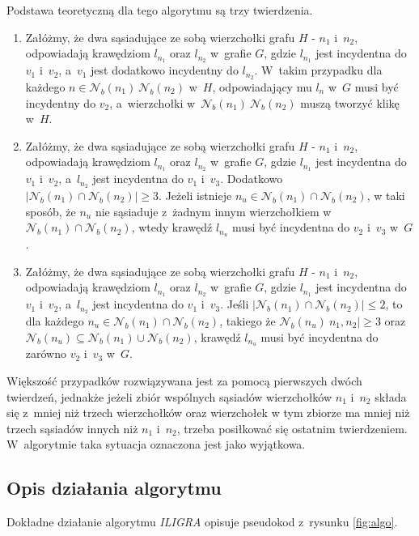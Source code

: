 \documentclass{article}
\begin{document}
Podstawa teoretyczną dla tego algorytmu są trzy twierdzenia. 
\begin{enumerate}
	\item Załóżmy, że dwa sąsiadujące ze sobą wierzchołki grafu $H$ - $n_1$ i~$n_2$, odpowiadają krawędziom $l_{n_1}$ oraz $l_{n_2}$ w~grafie $G$, gdzie $l_{n_1}$ jest incydentna do $v_1$ i~$v_2$, a~$v_1$ jest dodatkowo incydentny do $l_{n_2}$. W~takim przypadku dla każdego $n\in \mathcal{N}_b(n_1)\ \mathcal{N}_b(n_2)$ w~$H$, odpowiadający mu $l_n$ w~$G$ musi być incydentny do $v_2$, a~wierzchołki w~$\mathcal{N}_b(n_1)\ \mathcal{N}_b(n_2)$ muszą tworzyć klikę w~$H$.
	\item Załóżmy, że dwa sąsiadujące ze sobą wierzchołki grafu $H$ - $n_1$ i~$n_2$, odpowiadają krawędziom $l_{n_1}$ oraz $l_{n_2}$ w~grafie $G$, gdzie $l_{n_1}$ jest incydentna do $v_1$ i~$v_2$, a~$l_{n_2}$ jest incydentna do $v_1$ i~$v_3$. Dodatkowo $|\mathcal{N}_b(n_1)\cap \mathcal{N}_b(n_2)|\geq 3$. Jeżeli istnieje $n_u \in \mathcal{N}_b(n_1)\cap \mathcal{N}_b(n_2)$, w taki sposób, że $n_u$ nie sąsiaduje z~żadnym innym wierzchołkiem w~$\mathcal{N}_b(n_1)\cap \mathcal{N}_b(n_2)$, wtedy krawędź $l_{n_u}$ musi być incydentna do $v_2$ i~$v_3$ w~$G$.
	\item Załóżmy, że dwa sąsiadujące ze sobą wierzchołki grafu $H$ - $n_1$ i~$n_2$, odpowiadają krawędziom $l_{n_1}$ oraz $l_{n_2}$ w~grafie $G$, gdzie $l_{n_1}$ jest incydentna do $v_1$ i~$v_2$, a~$l_{n_2}$ jest incydentna do $v_1$ i~$v_3$. Jeśli $|\mathcal{N}_b(n_1)\cap \mathcal{N}_b(n_2)|\leq 2$, to dla każdego $n_u \in \mathcal{N}_b(n_1)\cap \mathcal{N}_b(n_2)$, takiego że $\mathcal{N}_b(n_u) \ {n_1,n_2}|\geq 3$ oraz $\mathcal{N}_b(n_u) \subseteq \mathcal{N}_b(n_1)\cup \mathcal{N}_b(n_2)$, krawędź $l_{n_u}$ musi być incydentna do zarówno $v_2$ i~$v_3$ w~$G$.
	
\end{enumerate}

	Większość przypadków rozwiązywana jest za pomocą pierwszych dwóch twierdzeń, jednakże jeżeli zbiór wspólnych sąsiadów wierzchołków $n_1$ i~$n_2$ składa się z~mniej niż trzech wierzchołków oraz wierzchołek w tym zbiorze ma mniej niż trzech sąsiadów innych niż $n_1$ i~$n_2$, trzeba posiłkować się ostatnim twierdzeniem. W~algorytmie taka sytuacja oznaczona jest jako wyjątkowa.

\subsection{Opis działania algorytmu}
Dokładne działanie algorytmu \textit{ILIGRA} opisuje pseudokod z~rysunku \ref{fig:algo}.
\end{document}
